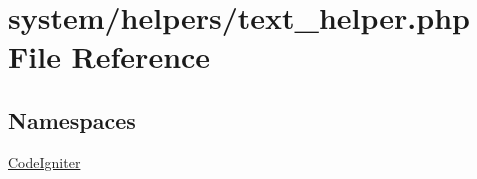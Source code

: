 \hypertarget{text__helper_8php}{\section{system/helpers/text\-\_\-helper.php File Reference}
\label{text__helper_8php}
}
\subsection*{Namespaces}
\begin{DoxyCompactItemize}
\item 
\hyperlink{namespace_code_igniter}{Code\-Igniter}
\end{DoxyCompactItemize}
